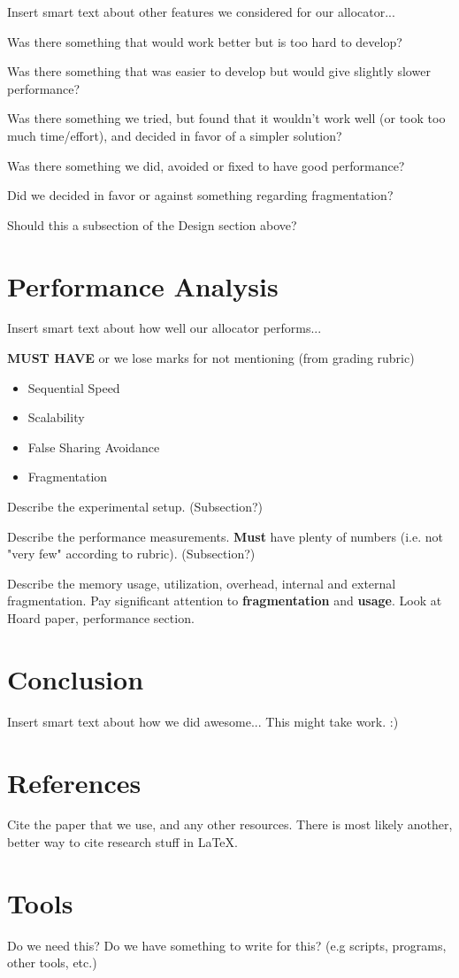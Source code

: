 \documentclass{article}
\begin{document}
Insert smart text about other features we considered for our allocator...

Was there something that would work better but is too hard to develop?

Was there something that was easier to develop but would give slightly slower
performance?

Was there something we tried, but found that it wouldn't work well (or took too 
much time/effort), and decided in favor of a simpler solution?

Was there something we did, avoided or fixed to have good performance?

Did we decided in favor or against something regarding fragmentation?

Should this a subsection of the Design section above?

\newpage
\section{Performance Analysis}

Insert smart text about how well our allocator performs...

\textbf{MUST HAVE} or we lose marks for not mentioning (from grading rubric)
\begin{itemize}
	\item Sequential Speed
	\item Scalability
	\item False Sharing Avoidance
	\item Fragmentation
\end{itemize}

Describe the experimental setup. (Subsection?)

Describe the performance measurements. \textbf{Must} have plenty of numbers 
(i.e. not "very few" according to rubric). (Subsection?)

Describe the memory usage, utilization, overhead, internal and external 
fragmentation. Pay significant attention to \textbf{fragmentation} and 
\textbf{usage}. Look at Hoard paper, performance section. 

\newpage
\section{Conclusion}

Insert smart text about how we did awesome... This might take work. :)

\newpage
\appendix
\section{References}

Cite the paper that we use, and any other resources. There is most likely another, better way to cite research stuff in \LaTeX{}.

\section{Tools}

Do we need this? Do we have something to write for this? (e.g scripts, programs, other tools, etc.)
\end{document}

